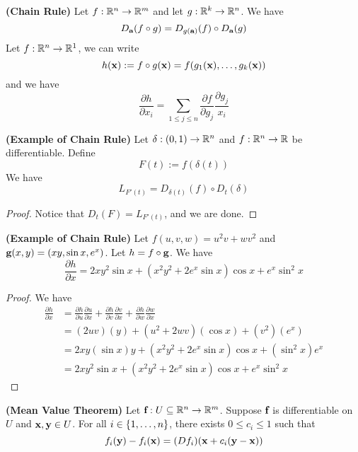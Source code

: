 \documentclass{report}
\begin{document}
\begin{theorem}
\label{4.3.4}
\textbf{(Chain Rule)} Let $f:\mathbb{R}^n\rightarrow \mathbb{R}^m$ and let $g:\mathbb{R}^k\rightarrow \mathbb{R}^n$. We have
\begin{equation}
D_{\textbf{a}}(f\circ g)=D_{g(\textbf{a})}(f)\circ D_{\textbf{a}}(g)
\end{equation}
Let $f:\mathbb{R}^n\rightarrow \mathbb{R}^1$, we can write 
\begin{equation}
h(\textbf{x}):=f\circ g(\textbf{x})=f(g_1(\textbf{x}),\dots, g_k(\textbf{x}))
\end{equation}
and we have
\begin{equation}
\frac{\partial h}{\partial x_i}=\sum_{1\leq j\leq n}\frac{\partial f}{\partial g_j}\frac{\partial g_j}{x_i}
\end{equation}
\end{theorem}
\begin{theorem}
\label{4.3.5}
\textbf{(Example of Chain Rule)} Let $\delta:(0,1)\rightarrow \mathbb{R}^n$ and $f:\mathbb{R}^n\rightarrow \mathbb{R}$ be differentiable. Define
\begin{equation}
F(t):=f(\delta (t))
\end{equation}
We have
\begin{equation}
L_{F'(t)}=D_{\delta (t)}(f)\circ D_{t}(\delta)
\end{equation}
\end{theorem}
\begin{proof}
Notice that $D_t(F)=L_{F'(t)}$, and we are done.
\end{proof}
\begin{theorem}
\label{4.3.6}
\textbf{(Example of Chain Rule)} Let $f(u,v,w)=u^2v+wv^2$ and $\textbf{g}(x,y)=(xy,\sin x,e^x)$. Let $h=f\circ \textbf{g}$. We have
\begin{equation}
\frac{\partial h}{\partial x}=2xy^2\sin x+(x^2y^2+2e^x\sin x) \cos x+ e^x\sin^2 x
\end{equation}
\end{theorem}
\begin{proof}
We have
\begin{align}
  \frac{\partial h}{\partial x}&=\frac{\partial h}{\partial u}\frac{\partial u}{\partial x}+\frac{\partial h}{\partial v}\frac{\partial v}{\partial x}+\frac{\partial h}{\partial w}\frac{\partial w}{\partial x}\\
  &=(2uv)(y)+(u^2+2wv)(\cos x)+(v^2)(e^x)\\
  &=2xy(\sin x)y+(x^2y^2+2e^x \sin x)\cos x+(\sin^2 x)e^x\\
  &=2xy^2\sin x+(x^2y^2+2e^x\sin x) \cos x+ e^x\sin^2 x
\end{align}
\end{proof}
\begin{theorem}
\label{4.3.7}
\textbf{(Mean Value Theorem)} Let $\textbf{f}:U\subseteq \mathbb{R}^n\rightarrow \mathbb{R}^m$. Suppose $\textbf{f}$ is differentiable on $U$ and $\textbf{x},\textbf{y}\in U$. For all $i\in \{ 1,\dots , n \}$, there exists $0\leq c_i\leq 1$ such that 
\begin{equation}
f_i(\textbf{y})-f_i(\textbf{x})=(Df_i)(\textbf{x}+c_i(\textbf{y}-\textbf{x}))
\end{equation}
\end{theorem}
\end{document}
